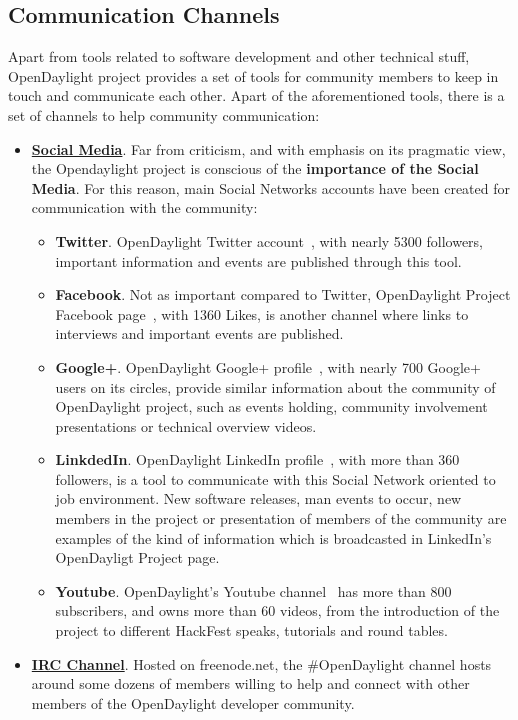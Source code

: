 \documentclass[a4paper, 12pt]{book}
\begin{document}
\subsection{Communication Channels}
Apart from tools related to software development and other technical stuff, OpenDaylight project provides a set of tools for community members to keep in touch and communicate each other. Apart of the aforementioned tools, there is a set of channels to help community communication:
\begin{itemize}\itemsep0pt
\item{\textbf{\underline{Social Media}}}. Far from criticism, and with emphasis on its pragmatic view, the Opendaylight project is conscious of the \textbf{importance of the Social Media}. For this reason, main Social Networks accounts have been created for communication with the community:
\begin{itemize}\itemsep0pt
\item{\textbf{Twitter}}. OpenDaylight Twitter account~\cite{OpenDaylightTwitter}, with nearly 5300 followers, important information and events are published through this tool.
\item{\textbf{Facebook}}. Not as important compared to Twitter, OpenDaylight Project Facebook page~\cite{OpenDaylightFacebook}, with 1360 Likes, is another channel where links to interviews and important events are published.
\item{\textbf{Google+}}. OpenDaylight Google+ profile~\cite{OpenDaylightGooglePlus}, with nearly 700 Google+ users on its circles, provide similar information about the community of OpenDaylight project, such as events holding, community involvement presentations or technical overview videos.
\item{\textbf{LinkdedIn}}. OpenDaylight LinkedIn profile~\cite{OpenDaylightLinkedIn}, with more than 360 followers, is a tool to communicate with this Social Network oriented to job environment. New software releases, man events to occur, new members in the project or presentation of members of the community are examples of the kind of information which is broadcasted in LinkedIn's OpenDayligt Project page.
\item{\textbf{Youtube}}. OpenDaylight's Youtube channel~\cite{OpenDaylightYoutube} has more than 800 subscribers, and owns more than 60 videos, from the introduction of the project to different HackFest speaks, tutorials and round tables.
\end{itemize}
\item{\textbf{\underline{IRC Channel}}}. Hosted on freenode.net, the \#OpenDaylight channel hosts around some dozens of members willing to help and connect with other members of the OpenDaylight developer community.

\end{itemize}
\end{document}
